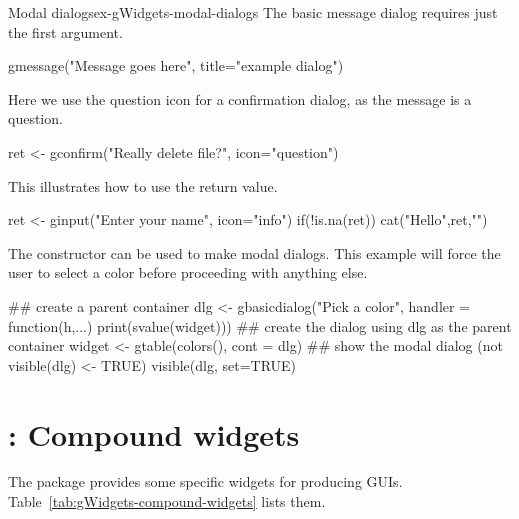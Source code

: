\begin{example}{Modal dialogs}{ex-gWidgets-modal-dialogs}
The basic message dialog requires just the first argument.
\begin{Schunk}
\begin{Sinput}
 gmessage("Message goes here", title="example dialog")
\end{Sinput}
\end{Schunk}

Here we use the question icon for a confirmation dialog, as the message is a question.
\begin{Schunk}
\begin{Sinput}
 ret <- gconfirm("Really delete file?", icon="question")
\end{Sinput}
\end{Schunk}

This illustrates how to use the return value.
\begin{Schunk}
\begin{Sinput}
 ret <- ginput("Enter your name", icon="info")
 if(!is.na(ret)) 
   cat("Hello",ret,"\n")
\end{Sinput}
\end{Schunk}

The  constructor can be used to make modal
dialogs. This example will force the user to
select a color before proceeding with anything else. 
\begin{Schunk}
\begin{Sinput}
 ## create a parent container
 dlg <- gbasicdialog("Pick a color", handler = 
                     function(h,...) print(svalue(widget)))
 ## create the dialog using dlg as the parent container
 widget <- gtable(colors(), cont = dlg)
 ## show the modal dialog (not visible(dlg) <- TRUE)
 visible(dlg, set=TRUE)    
\end{Sinput}
\end{Schunk}

\end{example}
















\section{: Compound widgets}
\label{sec:compound-widgets}
The  package provides some \R\/ specific widgets for
producing GUIs. Table~\ref{tab:gWidgets-compound-widgets} lists them.


